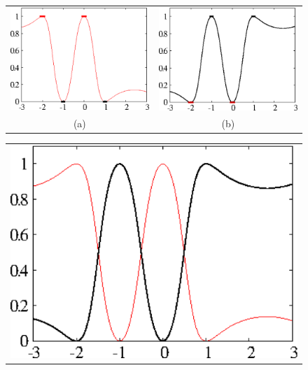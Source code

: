 \begin{figure}[!htb]
\centering
\begin{tabular}{cc}
\includegraphics[scale=0.153]{./ShepardClass1.eps} &
\includegraphics[scale=0.153]{./ShepardClass2.eps} \\
(a) & (b)\\
\end{tabular}
\begin{tabular}{c}
\includegraphics[scale=0.153]{./ShepardProbClass.eps} \\

\end{tabular}
\end{figure}
